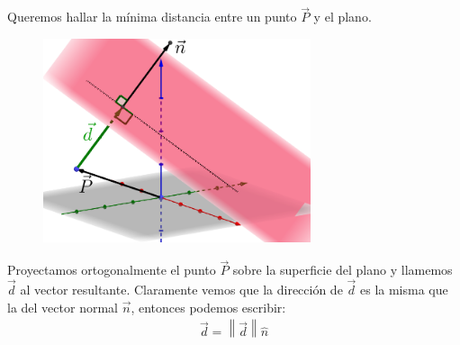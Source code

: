 \documentclass[12pt, fleqn]{report}                             %
\theoremstyle{break}                                            %
\newcommand{\Abs}[1]    {\left\lVert #1 \right\lVert}           %
\begin{document}
            Queremos hallar la mínima distancia entre un punto $\vec{P}$ y el plano.
            
            \begin{figure}[H]
                \centering
                \includegraphics[width=0.7\textwidth]{distancePointPlane}
            \end{figure}
            
            Proyectamos ortogonalmente el punto $\vec{P}$ sobre la superficie del plano y llamemos $\vec{d}$ al vector resultante.
            Claramente vemos que la dirección de $\vec{d}$ es la misma que la del vector normal $\vec{n}$, entonces podemos escribir:
            \begin{align}
                \vec{d} = \Abs{\vec{d}} \hat{n}
            \end{align}
            
            \clearpage
\end{document}
